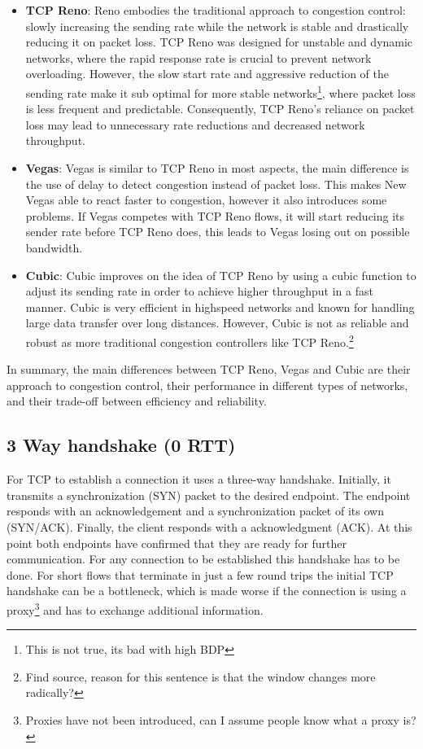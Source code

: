 \documentclass[a4paper,english, 11pt]{report}
\begin{document}
\begin{itemize}
  \item \textbf{TCP Reno}: Reno embodies the traditional approach to congestion control: slowly increasing the sending rate while the network is stable and drastically reducing it on packet loss. TCP Reno was designed for unstable and dynamic networks, where the rapid response rate is crucial to prevent network overloading. However, the slow start rate and aggressive reduction of the sending rate make it sub optimal for more stable networks\footnote{This is not true, its bad with high BDP}, where packet loss is less frequent and predictable. Consequently, TCP Reno's reliance on packet loss may lead to unnecessary rate reductions and decreased network throughput.
  \item \textbf{Vegas}: Vegas is similar to TCP Reno in most aspects, the main difference is the use of delay to detect congestion instead of packet loss. This makes New Vegas able to react faster to congestion, however it also introduces some problems. If Vegas competes with TCP Reno flows, it will start reducing its sender rate before TCP Reno does, this leads to Vegas losing out on possible bandwidth. 
  \item \textbf{Cubic}: Cubic improves on the idea of TCP Reno by using a cubic function to adjust its sending rate in order to achieve higher throughput in a fast manner. Cubic is very efficient in highspeed networks and known for handling large data transfer over long distances. However, Cubic is not as reliable and robust as more traditional congestion controllers like TCP Reno.\footnote{Find source, reason for this sentence is that the window changes  more radically?}
\end{itemize}

In summary, the main differences between TCP Reno, Vegas and Cubic are their approach to congestion control, their performance in different types of networks, and their trade-off between efficiency and reliability.

\subsection{3 Way handshake (0 RTT)}
For TCP to establish a connection it uses a three-way handshake. Initially, it transmits a synchronization (SYN) packet to the desired endpoint. The endpoint responds with an acknowledgement and a synchronization packet of its own (SYN/ACK). Finally, the client responds with a acknowledgment (ACK). At this point both endpoints have confirmed that they are ready for further communication. For any connection to be established this handshake has to be done. For short flows that terminate in just a few round trips the initial TCP handshake can be a bottleneck, which is made worse if the connection is using a proxy\footnote{Proxies have not been introduced, can I assume people know what a proxy is?} and has to exchange additional information. 
\end{document}
